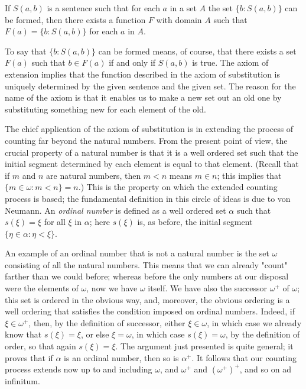 \begin{named} If $S(a,b)$ is a sentence such that for each $a$ in a set $A$ the set $\{ b: S(a, b) \}$ can be formed, then there exists a function $F$ with domain $A$ such that $F(a) = \{ b: S(a,b) \} $ for each $a$ in $A$.
\end{named}

To say that $\{ b: S(a,b) \} $ can be formed means, of course, that there exists a set $F(a)$ such that $b \in F(a)$ if and only if $S(a,b)$ is true. The axiom of extension implies that the function described in the axiom of substitution is uniquely determined by the given sentence and the given set. The reason for the name of the axiom is that it enables us to make a new set out an old one by substituting something new for each element of the old. 

The chief application of the axiom of substitution is in extending the process of counting far beyond the natural numbers. From the present point of view, the crucial property of a natural number is that it is a well ordered set such that the initial segment determined by each element is equal to that element. (Recall that if $m$ and $n$ are natural numbers, then $m < n$ means $m \in n$; this implies that $\{ m \in \omega : m <n \} = n$.) This is the property on which the extended counting process is based; the fundamental definition in this circle of ideas is due to von Neumann. An \textit{ordinal number} is defined as a well ordered set $\alpha$ such that $s( \xi ) = \xi$ for all $\xi $ in $\alpha$; here $s( \xi )$ is, as before, the initial segment $\{ \eta \in \alpha: \eta < \xi \} $.

An example of an ordinal number that is not a natural number is the set $\omega$ consisting of all the natural numbers. This means that we can already "count" farther than we could before; whereas before the only numbers at our disposal were the elements of $\omega$, now we have $\omega$ itself. We have also the successor $ \omega^{+}$ of $\omega$; this set is ordered in the obvious way, and, moreover, the obvious ordering is a well ordering that satisfies the condition imposed on ordinal numbers. Indeed, if $\xi \in \omega^{+}$, then, by the definition of successor, either $\xi \in \omega$, in which case we already know that $s( \xi ) = \xi$, or else $ \xi = \omega$, in which case $s( \xi ) =  \omega$, by the definition of order, so that again $s( \xi ) = \xi$. The argument just presented is quite general; it proves that if $\alpha$ is an ordinal number, then so is $\alpha^{+}$. It follows that our counting process extends now up to and including $\omega$, and $\omega^{+}$ and $(\omega^{+})^{+}$, and so on ad infinitum.

